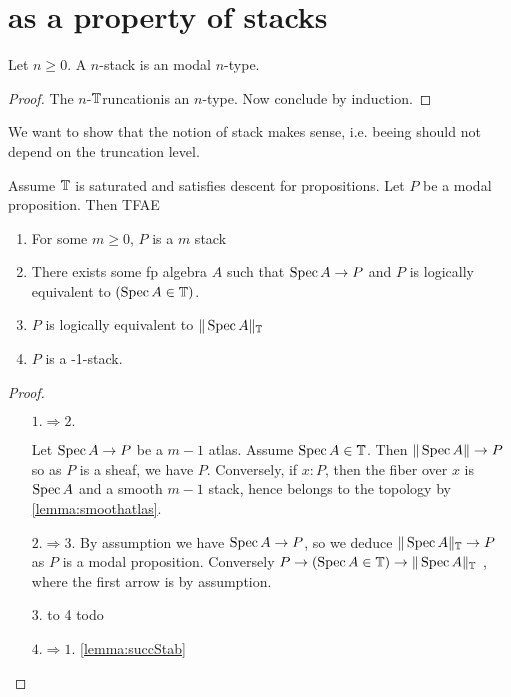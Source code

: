 \documentclass{article}
\newcommand{\truncation}{$\bT$runcation}
\newcommand{\red}[1]{{\color{red} #1}}
\begin{document}
\section{ as a property of stacks}


\begin{lemma}
    Let $n \ge 0$. A  $n$-stack is an modal $n$-type.
\end{lemma}
\begin{proof}
     The $n$-\truncation is an $n$-type. Now conclude by induction.
\end{proof}
We want to show that the notion of  stack makes sense, i.e. beeing  should not depend on the truncation level. 

\begin{lemma}{\label{lemma:prop0stacks}}
     Assume $\mathbb{T}$ is saturated and satisfies descent for propositions. Let $P$ be a modal proposition. Then TFAE 
     \begin{enumerate}
         \item For some $m \ge 0$, $P$ is a  $m$ stack 
         \item There exists some fp algebra $A$ such that $\operatorname{Spec} A \to P$ and $P$ is logically equivalent to $(\operatorname{Spec} A \in \mathbb{T})$.
         \item $P$ is logically equivalent to $\|\operatorname{Spec} A\|_{\mathbb{T}}$
         \item $P$ is a  -1-stack.
     \end{enumerate}
     
     
\end{lemma}
\begin{proof}
\
    \begin{itemize}
        \item[$1.\Rightarrow 2.$]
    
     Let $\operatorname{Spec} A \to P$ be a $m-1$ atlas. Assume $\operatorname{Spec} A \in \mathbb{T}$. Then $\|\operatorname{Spec} A\| \to P$ so as $P$ is a sheaf, we have $P$. Conversely, if $x : P$, then the fiber over $x$ is $\operatorname{Spec} A$ and a smooth $m-1$ stack, hence belongs to the topology by \ref{lemma:smoothatlas}. 
     \item[$2. \Rightarrow 3.$]
        By assumption we have $\operatorname{Spec} A \to P$, so we deduce $\|\operatorname{Spec} A\|_{\mathbb{T}} \to P$ as $P$ is a modal proposition. Conversely $P \to (\operatorname{Spec} A \in \mathbb{T}) \to \|\operatorname{Spec} A\|_{\mathbb{T}}$ , where the first arrow is by assumption.
        \item [3. to 4] todo
        \item [$4. \Rightarrow 1.$] \ref{lemma:succStab}
     \end{itemize}
\end{proof}
\end{document}
